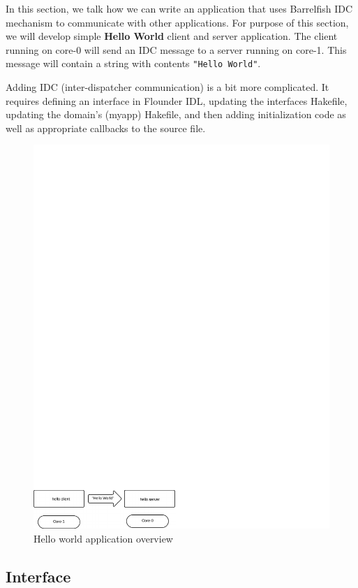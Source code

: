 In this section, we talk how we can write an application that uses Barrelfish
IDC mechanism to communicate with other applications.  For purpose of this
section, we will develop simple \textbf{Hello World} client and server
application.  The client running on core-0 will send an IDC message to a
server running on core-1.  This message will contain a string with contents
\texttt{"Hello World"}.

Adding IDC (inter-dispatcher communication) is a bit more complicated. It
requires defining an interface in Flounder IDL, updating the interfaces
Hakefile, updating the domain's (myapp) Hakefile, and then adding initialization
code as well as appropriate callbacks to the source file.

\begin{figure}
  \begin{center}
    \includegraphics[width=0.8\columnwidth]{helloWorld2.pdf}
  \end{center}
  \caption{Hello world application overview}
  \label{fig:helloWorld}
\end{figure}

\subsection{Interface}

